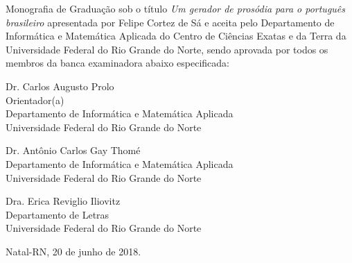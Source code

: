 \begin{folhadeaprovacao}
	\setlength{\ABNTsignthickness}{0.4pt}
	\setlength{\ABNTsignwidth}{10cm}
	
	\noindent 
	Monografia de Graduação sob o título \textit{Um gerador de prosódia para o português brasileiro} apresentada por 
	Felipe Cortez de Sá e aceita pelo Departamento de Informática e Matemática Aplicada do
	Centro de Ciências Exatas e da Terra da Universidade Federal do Rio Grande do Norte,
	sendo aprovada por todos os membros da banca examinadora abaixo especificada:
		
	\assinatura
	{
		Dr. Carlos Augusto Prolo\\
		{\small Orientador(a)} \\ 
		{\footnotesize
            Departamento de Informática e Matemática Aplicada\\
		  	Universidade Federal do Rio Grande do Norte
		}
	}
	
		
	\assinatura
	{
        Dr. Antônio Carlos Gay Thomé\\ 
		{\footnotesize
            Departamento de Informática e Matemática Aplicada\\
		  	Universidade Federal do Rio Grande do Norte
		}
	}
		
	\assinatura
	{
		Dra. Erica Reviglio Iliovitz \\ 
		{\footnotesize
            Departamento de Letras\\
		  	Universidade Federal do Rio Grande do Norte
		}
	}
		
	\vfill
	
	\begin{center}
		Natal-RN, 20 de junho de 2018.
	\end{center}
\end{folhadeaprovacao}
